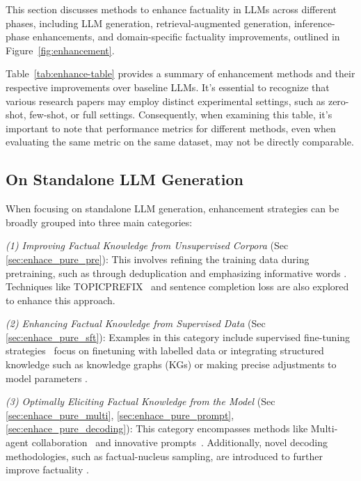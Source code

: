 



This section discusses methods to enhance factuality in LLMs across different phases, including LLM generation, retrieval-augmented generation, inference-phase enhancements, and domain-specific factuality improvements, outlined in Figure~\ref{fig:enhancement}. 




Table~\ref{tab:enhance-table} provides a summary of enhancement methods and their respective improvements over baseline LLMs. It's essential to recognize that various research papers may employ distinct experimental settings, such as zero-shot, few-shot, or full settings. Consequently, when examining this table, it's important to note that performance metrics for different methods, even when evaluating the same metric on the same dataset, may not be directly comparable.



\subsection{On Standalone LLM Generation}
\label{sec:enhace_pure}

When focusing on standalone LLM generation, enhancement strategies can be broadly grouped into three main categories:

\emph{(1)
Improving Factual Knowledge from Unsupervised Corpora} (Sec \ref{sec:enhace_pure_pre}):
This involves refining the training data during pretraining, such as through deduplication and emphasizing informative words \citep{lee-etal-2022-deduplicating}. Techniques like TOPICPREFIX~\citep{lee2022factuality} and sentence completion loss are also explored to enhance this approach.

\emph{(2)
Enhancing Factual Knowledge from Supervised Data} (Sec \ref{sec:enhace_pure_sft}):
Examples in this category include supervised fine-tuning strategies~\citep{chung2022scaling,LIMA} focus on finetuning with labelled data or integrating structured knowledge such as knowledge graphs (KGs) or making precise adjustments to model parameters \citep{li2023inferencetime}.

\emph{(3)
Optimally Eliciting Factual Knowledge from the Model} (Sec \ref{sec:enhace_pure_multi}, \ref{sec:enhace_pure_prompt}, \ref{sec:enhace_pure_decoding}):
This category encompasses methods like Multi-agent collaboration~\citep{multiagent_debate} and innovative prompts~\citep{yu2023generate}. Additionally, novel decoding methodologies, such as factual-nucleus sampling, are introduced to further improve factuality \citep{lee2022factuality, chuang2023dola}.

